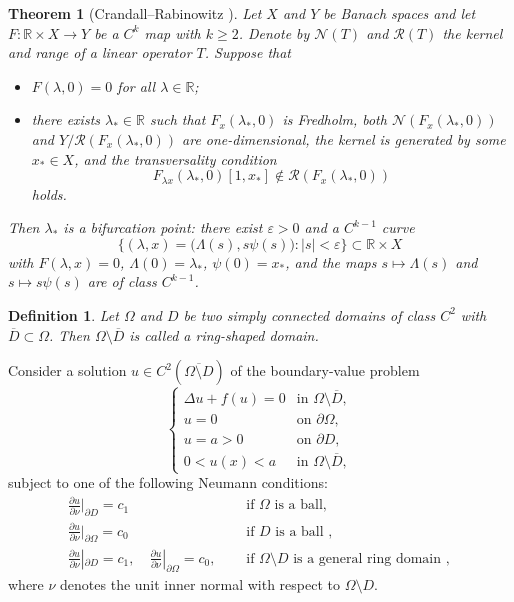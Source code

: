 \documentclass[reqno]{amsart}
\numberwithin{equation}{section}
\newtheorem{theorem}{Theorem}[section]
\newtheorem{definition}{Definition}[section]
\numberwithin{equation}{section}
\numberwithin{equation}{section}
\begin{document}
\begin{theorem}[Crandall--Rabinowitz \cite{CrandallR}] \label{thm6.1}
Let \(X\) and \(Y\) be Banach spaces and let \(F \colon \mathbb{R} \times X \to Y\) be a \(C^k\) map with \(k \geq 2\). Denote by \(\mathcal{N}(T)\) and \(\mathcal{R}(T)\) the kernel and range of a linear operator \(T\). Suppose that
\begin{itemize}
\item[(H1)] \(F(\lambda, 0) = 0\) for all \(\lambda \in \mathbb{R}\);
\item[(H2)] there exists \(\lambda_* \in \mathbb{R}\) such that \(F_x(\lambda_*, 0)\) is Fredholm, both \(\mathcal{N}(F_x(\lambda_*, 0))\) and \(Y / \mathcal{R}(F_x(\lambda_*, 0))\) are one-dimensional, the kernel is generated by some \(x_* \in X\), and the transversality condition
\[
F_{\lambda x}(\lambda_*, 0)[1, x_*] \notin \mathcal{R}(F_x(\lambda_*, 0))
\]
holds.
\end{itemize}
Then \(\lambda_*\) is a bifurcation point: there exist \(\varepsilon > 0\) and a \(C^{k-1}\) curve
\[
\bigl\{ (\lambda, x) = \bigl( \Lambda(s), s \psi(s) \bigr) : |s| < \varepsilon \bigr\} \subset \mathbb{R} \times X
\]
with \(F(\lambda, x) = 0\), \(\Lambda(0) = \lambda_*\), \(\psi(0) = x_*\), and the maps \(s \mapsto \Lambda(s)\) and \(s \mapsto s\psi(s)\) are of class \(C^{k-1}\).
\end{theorem}

\begin{definition}
Let \(\Omega\) and \(D\) be two simply connected domains of class \(C^2\) with \(\overline{D} \subset \Omega\). Then \(\Omega \setminus \overline{D}\) is called a ring-shaped domain.
\end{definition}

Consider a solution \(u \in C^2(\overline{\Omega \setminus D})\) of the boundary-value problem
\begin{equation}\label{e6.1}
\begin{cases}
\Delta u + f(u) = 0 & \text{in } \Omega \setminus \overline{D}, \\
u = 0 & \text{on } \partial \Omega, \\
u = a > 0 & \text{on } \partial D, \\
0 < u(x) < a & \text{in } \Omega \setminus \overline{D},
\end{cases}
\end{equation}
subject to one of the following Neumann conditions:
\begin{subequations}\label{e6.2}
\begin{align}
\frac{\partial u}{\partial\nu}|_{\partial D}=c_1 &\quad\text{ if $\Omega$ is a ball}, \label{e6.2a}\\
\frac{\partial u}{\partial\nu}|_{\partial \Omega}=c_0 &\quad\text{ if $D$ is a ball },\label{e6.2b}\\
\frac{\partial u}{\partial\nu}|_{\partial D}=c_1, \quad \frac{\partial u}{\partial\nu}|_{\partial \Omega}=c_0,  &\quad\text{ if $\Omega\setminus D$ is a general ring domain } ,\label{e6.2c}
\end{align}
\end{subequations}
where \(\nu\) denotes the unit inner normal with respect to \(\Omega \setminus D\).
\end{document}

